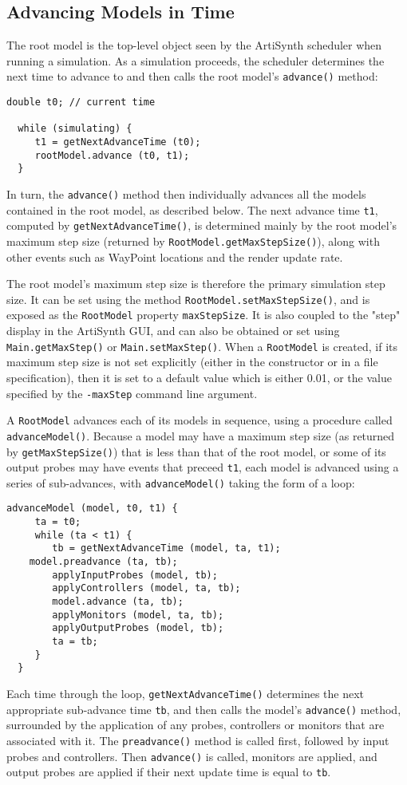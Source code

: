 \documentclass{article}
\begin{document}
\subsection{Advancing Models in Time}

The root model is the top-level object seen by the ArtiSynth scheduler
when running a simulation. As a simulation proceeds, the scheduler determines
the next time to advance to and then calls the root model's {\tt advance()}
method:
\begin{lstlisting}[]
  double t0; // current time

  while (simulating) {
     t1 = getNextAdvanceTime (t0);
     rootModel.advance (t0, t1);
  }
\end{lstlisting}

In turn, the {\tt advance()} method then individually advances all the
models contained in the root model, as described below.  The next
advance time {\tt t1}, computed by {\tt getNextAdvanceTime()}, is
determined mainly by the root model's maximum step size (returned by
{\tt RootModel.getMaxStep\-Size()}), along with other events such as
WayPoint locations and the render update rate.

The root model's maximum step size is therefore the primary simulation
step size. It can be set using the method
{\tt RootModel.setMaxStepSize()}, and is exposed as the {\tt RootModel}
property {\tt maxStepSize}.  It is also coupled to the "step" display in
the ArtiSynth GUI, and can also be obtained or set using
{\tt Main.getMaxStep()} or {\tt Main.setMaxStep()}. When a {\tt RootModel} is
created, if its maximum step size is not set explicitly (either in the
constructor or in a file specification), then it is set to a default
value which is either 0.01, or the value specified by the {\tt -maxStep}
command line argument.

A {\tt RootModel} advances each of its models in sequence, using a
procedure called {\tt advanceModel()}. Because a model may have a
maximum step size (as returned by {\tt getMaxStepSize()}) that is less
than that of the root model, or some of its output probes may have
events that preceed {\tt t1}, each model is advanced using
a series of sub-advances, with {\tt advanceModel()} taking the
form of a loop:
\begin{lstlisting}[]
  advanceModel (model, t0, t1) {
     ta = t0;
     while (ta < t1) {
        tb = getNextAdvanceTime (model, ta, t1);
	model.preadvance (ta, tb);
        applyInputProbes (model, tb);
        applyControllers (model, ta, tb);
        model.advance (ta, tb);
        applyMonitors (model, ta, tb);
        applyOutputProbes (model, tb);
        ta = tb;
     }
  }
\end{lstlisting}
Each time through the loop, {\tt getNextAdvanceTime()} determines the
next appropriate sub-advance time {\tt tb}, and then calls the model's
{\tt advance()} method, surrounded by the application of any probes,
controllers or monitors that are associated with it.
The {\tt preadvance()} method is called first, followed
by input probes and controllers.
Then {\tt advance()} is called, monitors are applied, and
output probes are applied if their next update time is equal to
{\tt tb}.
\end{document}
